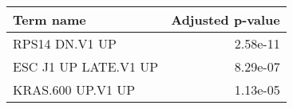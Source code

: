 \begin{tabular}{lr}
\toprule
           Term name &  Adjusted p-value \\
\midrule
      RPS14 DN.V1 UP &          2.58e-11 \\
ESC J1 UP LATE.V1 UP &          8.29e-07 \\
   KRAS.600 UP.V1 UP &          1.13e-05 \\
\bottomrule
\end{tabular}
